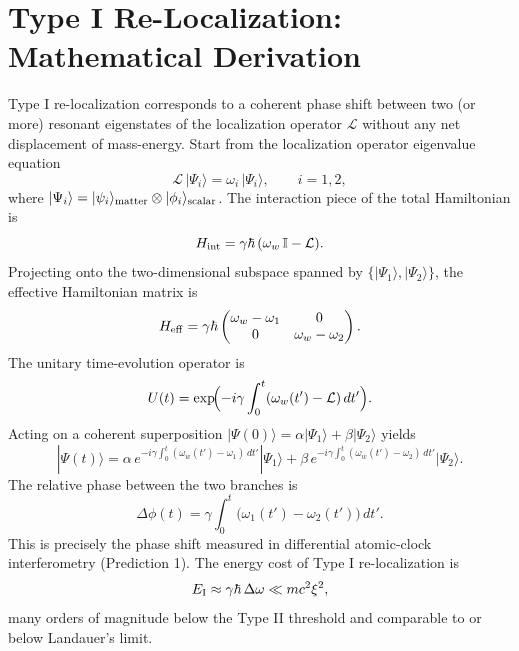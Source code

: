 \documentclass[conference,letterpaper,10pt]{IEEEtran}
\begin{document}
\section{Type I Re-Localization: Mathematical Derivation}
Type I re-localization corresponds to a coherent phase shift between two (or more) resonant eigenstates of the
localization operator \(\mathcal{L}\) without any net displacement of mass-energy. Start from the localization operator
eigenvalue equation
\begin{equation}
\mathcal{L}\,|\Psi_i\rangle = \omega_i\,|\Psi_i\rangle, \qquad i=1,2,
\label{eq:type1-eigen}
\end{equation}
where \(|\Psi_i\rangle = |\psi_i\rangle_{\rm matter} \otimes |\phi_i\rangle_{\rm scalar}\).
The interaction piece of the total Hamiltonian is
\begin{equation}
H_{\rm int} = \gamma\hbar\,(\omega_w\,\mathbb{I} - \mathcal{L}).
\label{eq:type1-hint}
\end{equation}
Projecting onto the two-dimensional subspace spanned by \(\{|\Psi_1\rangle,|\Psi_2\rangle\}\), the effective Hamiltonian
matrix is
\begin{equation}
H_{\rm eff} = \gamma\hbar\begin{pmatrix}
\omega_w - \omega_1 & 0 \\
0 & \omega_w - \omega_2
\end{pmatrix}.
\label{eq:type1-heff}
\end{equation}
The unitary time-evolution operator is
\begin{equation}
U(t) = \exp\!\Bigl(-i\gamma\int_0^t(\omega_w(t')-\mathcal{L})\,dt'\Bigr).
\label{eq:type1-evo}
\end{equation}
Acting on a coherent superposition \(|\Psi(0)\rangle = \alpha|\Psi_1\rangle + \beta|\Psi_2\rangle\) yields
\begin{equation}
|\Psi(t)\rangle = \alpha\,e^{-i\gamma\int_0^t(\omega_w(t')-\omega_1)\,dt'}|\Psi_1\rangle
+ \beta\,e^{-i\gamma\int_0^t(\omega_w(t')-\omega_2)\,dt'}|\Psi_2\rangle.
\label{eq:type1-superpos}
\end{equation}
The relative phase between the two branches is
\begin{equation}
\Delta\phi(t) = \gamma\int_0^t\bigl(\omega_1(t') - \omega_2(t')\bigr)\,dt'.
\label{eq:type1-deltaphi}
\end{equation}
This is precisely the phase shift measured in differential atomic-clock interferometry (Prediction 1). The energy cost
 of Type I re-localization is
\begin{equation}
E_{\rm I} \approx \gamma\hbar\,\Delta\omega \ll mc^2\xi^2,
\label{eq:type1-energy}
\end{equation}
many orders of magnitude below the Type II threshold and comparable to or below Landauer's limit.
\end{document}
